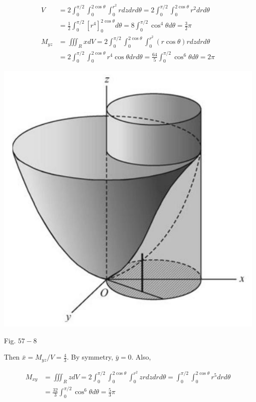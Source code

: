 \documentclass[10pt]{article}
\begin{document}
$$
\begin{aligned}
V & =2 \int_{0}^{\pi / 2} \int_{0}^{2 \cos \theta} \int_{0}^{r^{2}} r d z d r d \theta=2 \int_{0}^{\pi / 2} \int_{0}^{2 \cos \theta} r^{2} d r d \theta \\
& =\frac{1}{2} \int_{0}^{\pi / 2}\left[r^{4}\right]_{0}^{2 \cos \theta} d \theta=8 \int_{0}^{\pi / 2} \cos ^{4} \theta d \theta=\frac{3}{2} \pi \\
M_{y z} & =\iiint_{R} x d V=2 \int_{0}^{\pi / 2} \int_{0}^{2 \cos \theta} \int_{0}^{r^{2}}(r \cos \theta) r d z d r d \theta \\
& =2 \int_{0}^{\pi / 2} \int_{0}^{2 \cos \theta} r^{4} \cos \theta d r d \theta=\frac{64}{5} \int_{0}^{\pi / 2} \cos ^{6} \theta d \theta=2 \pi
\end{aligned}
$$

\begin{center}
\includegraphics[max width=\textwidth]{2024_04_20_fe2e8e718cc0fcd63d1bg-06}
\end{center}

Fig. $57-8$

Then $\bar{x}=M_{y z} / V=\frac{4}{3}$. By symmetry, $\bar{y}=0$. Also,

$$
\begin{aligned}
M_{x y} & =\iiint_{R} z d V=2 \int_{0}^{\pi / 2} \int_{0}^{2 \cos \theta} \int_{0}^{r^{2}} z r d z d r d \theta=\int_{0}^{\pi / 2} \int_{0}^{2 \cos \theta} r^{5} d r d \theta \\
& =\frac{32}{3} \int_{0}^{\pi / 2} \cos ^{6} \theta d \theta=\frac{5}{3} \pi
\end{aligned}
$$
\end{document}
